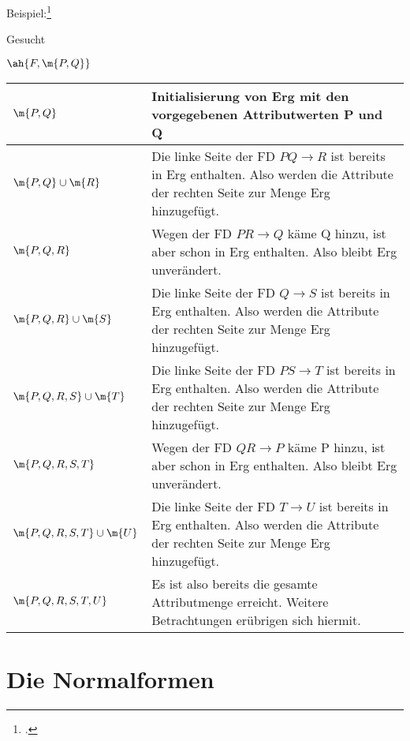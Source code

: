 \documentclass{bschlangaul-theorie}
\begin{document}
Beispiel:\footcite[Seite 8]{db:fs:4}


Gesucht

$\ah{F, \m{P,Q}}$

\noindent
\begin{tabularx}{\linewidth}{lX}
$\m{P, Q}$ &
Initialisierung von Erg mit den vorgegebenen Attributwerten P und Q
\\\hline

$\m{P, Q} \cup \m{R}$  &
Die linke Seite der FD $P Q \rightarrow R$ ist bereits in Erg enthalten.
Also werden die Attribute der rechten Seite zur Menge Erg hinzugefügt.
\\\hline

$\m{P, Q, R}$ &
Wegen der FD $PR \rightarrow Q$ käme Q hinzu, ist aber schon in Erg
enthalten. Also bleibt Erg unverändert.
\\\hline

$\m{P, Q, R} \cup \m{S}$ &
Die linke Seite der FD $Q \rightarrow S$ ist bereits in Erg enthalten.
Also werden die Attribute der rechten Seite zur Menge Erg hinzugefügt.
\\\hline

$\m{P, Q, R, S} \cup \m{T}$ &
Die linke Seite der FD $PS \rightarrow T$ ist bereits in Erg enthalten.
Also werden die Attribute der rechten Seite zur Menge Erg hinzugefügt.
\\\hline

$\m{P, Q, R, S, T}$ &
Wegen der FD $QR \rightarrow P$ käme P hinzu, ist aber schon in Erg
enthalten. Also bleibt Erg unverändert.
\\\hline

$\m{P, Q, R, S, T} \cup \m{U}$ &
Die linke Seite der FD $T \rightarrow U$ ist bereits in Erg enthalten.
Also werden die Attribute der rechten Seite zur Menge Erg hinzugefügt.
\\\hline

$\m{P, Q, R, S, T, U}$ &
Es ist also bereits die gesamte Attributmenge erreicht. Weitere
Betrachtungen erübrigen sich hiermit.
\\\hline
\end{tabularx}

\section{Die Normalformen}

%
\end{document}
